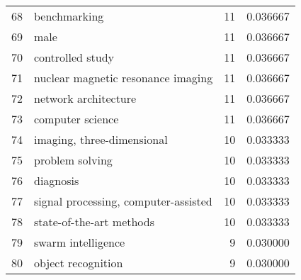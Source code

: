 \begin{tabular}{llrr}
68 &                             benchmarking &          11 &    0.036667 \\
69 &                                     male &          11 &    0.036667 \\
70 &                         controlled study &          11 &    0.036667 \\
71 &       nuclear magnetic resonance imaging &          11 &    0.036667 \\
72 &                     network architecture &          11 &    0.036667 \\
73 &                         computer science &          11 &    0.036667 \\
74 &               imaging, three-dimensional &          10 &    0.033333 \\
75 &                          problem solving &          10 &    0.033333 \\
76 &                                diagnosis &          10 &    0.033333 \\
77 &     signal processing, computer-assisted &          10 &    0.033333 \\
78 &                 state-of-the-art methods &          10 &    0.033333 \\
79 &                       swarm intelligence &           9 &    0.030000 \\
80 &                       object recognition &           9 &    0.030000 \\
\bottomrule
\end{tabular}

